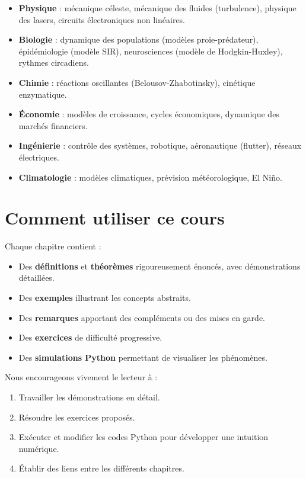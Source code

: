 \begin{itemize}
    \item \textbf{Physique} : m\'ecanique c\'eleste, m\'ecanique des fluides
    (turbulence), physique des lasers, circuits \'electroniques non lin\'eaires.

    \item \textbf{Biologie} : dynamique des populations (mod\`eles
    proie-pr\'edateur), \'epid\'emiologie (mod\`ele SIR), neurosciences
    (mod\`ele de Hodgkin-Huxley), rythmes circadiens.

    \item \textbf{Chimie} : r\'eactions oscillantes (Belousov-Zhabotinsky),
    cin\'etique enzymatique.

    \item \textbf{\'Economie} : mod\`eles de croissance, cycles \'economiques,
    dynamique des march\'es financiers.

    \item \textbf{Ing\'enierie} : contr\^ole des syst\`emes, robotique,
    a\'eronautique (flutter), r\'eseaux \'electriques.

    \item \textbf{Climatologie} : mod\`eles climatiques, pr\'evision
    m\'et\'eorologique, El Ni\~no.
\end{itemize}

\section*{Comment utiliser ce cours}

Chaque chapitre contient :
\begin{itemize}
    \item Des \textbf{d\'efinitions} et \textbf{th\'eor\`emes} rigoureusement
    \'enonc\'es, avec d\'emonstrations d\'etaill\'ees.
    \item Des \textbf{exemples} illustrant les concepts abstraits.
    \item Des \textbf{remarques} apportant des compl\'ements ou des mises en
    garde.
    \item Des \textbf{exercices} de difficult\'e progressive.
    \item Des \textbf{simulations Python} permettant de visualiser les
    ph\'enom\`enes.
\end{itemize}

Nous encourageons vivement le lecteur \`a :
\begin{enumerate}
    \item Travailler les d\'emonstrations en d\'etail.
    \item R\'esoudre les exercices propos\'es.
    \item Ex\'ecuter et modifier les codes Python pour d\'evelopper une
    intuition num\'erique.
    \item \'Etablir des liens entre les diff\'erents chapitres.
\end{enumerate}

